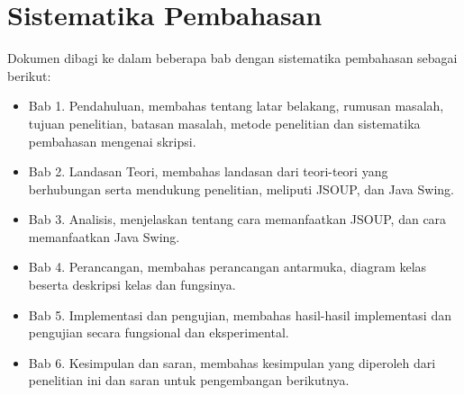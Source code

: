 \section{Sistematika Pembahasan}
\label{sec:sispem}
Dokumen dibagi ke dalam beberapa bab dengan sistematika pembahasan sebagai berikut:
    \begin{itemize}
        \item Bab 1. Pendahuluan, membahas tentang latar belakang, rumusan masalah, tujuan penelitian, batasan masalah, metode penelitian dan sistematika pembahasan mengenai skripsi.
        \item Bab 2. Landasan Teori, membahas landasan dari teori-teori yang berhubungan serta mendukung penelitian, meliputi JSOUP, dan Java Swing. 
        \item Bab 3. Analisis, menjelaskan tentang cara memanfaatkan JSOUP, dan cara memanfaatkan Java Swing.
        \item Bab 4. Perancangan, membahas perancangan antarmuka, diagram kelas beserta deskripsi kelas dan fungsinya.
        \item Bab 5. Implementasi dan pengujian, membahas hasil-hasil implementasi dan pengujian secara fungsional dan eksperimental.
        \item Bab 6. Kesimpulan dan saran, membahas kesimpulan yang diperoleh dari penelitian ini dan saran untuk pengembangan berikutnya.
    \end{itemize}